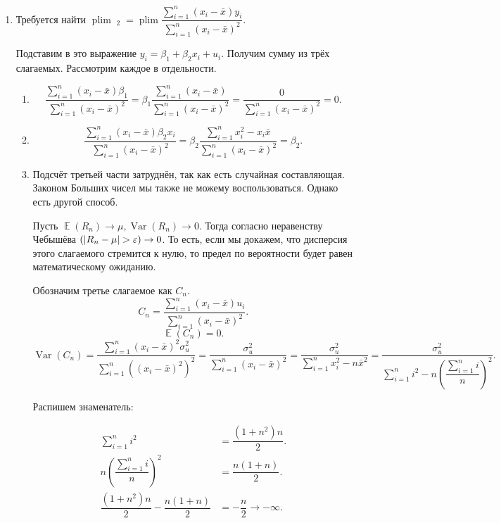 \documentclass[10pt, a4paper]{extarticle}
\let\P\relax
\DeclareMathOperator{\P}{\mathbb{P}}
\DeclareMathOperator{\E}{\mathbb{E}}
\DeclareMathOperator{\plim}{plim}
\DeclareMathOperator{\Var}{Var}
\DeclareMathOperator{\hb}{\hat{\beta}}
\begin{document}
\begin{enumerate}
	\item 
	
	Требуется найти $\plim \hb_2 = \plim \dfrac{\sum_{i = 1}^n(x_i - \bar{x})y_i}{\sum_{i = 1}^n(x_i - \bar{x})^2}$.
	
	Подставим в это выражение $y_i = \beta_1 + \beta_2x_i + u_i$. Получим сумму из трёх слагаемых. Рассмотрим каждое в отдельности.
	
	\begin{enumerate}
		\item 
		
		\[\dfrac{\sum_{i = 1}^n(x_i - \bar{x})\beta_1}{\sum_{i = 1}^n(x_i - \bar{x})^2} = \beta_1 \dfrac{\sum_{i = 1}^n(x_i - \bar{x})}{\sum_{i = 1}^n(x_i - \bar{x})^2} = \dfrac{0}{\sum_{i = 1}^n(x_i - \bar{x})^2} = 0.\]
		
		\item 
		
		\[\dfrac{\sum_{i = 1}^n(x_i - \bar{x})\beta_2x_i}{\sum_{i = 1}^n(x_i - \bar{x})^2} = \beta_2 \dfrac{\sum_{i = 1}^n x_i^2 - x_i\bar{x}}{\sum_{i = 1}^n(x_i - \bar{x})^2} = \beta_2.\]
		
		\item 
		
		Подсчёт третьей части затруднён, так как есть случайная составляющая. Законом Больших чисел мы также не можему воспользоваться. Однако есть другой способ. 
		
		Пусть $\E(R_n) \to \mu, \Var(R_n) \to 0$. Тогда согласно неравенству Чебышёва $\P(|R_n - \mu| > \varepsilon) \to 0$. То есть, если мы докажем, что дисперсия этого слагаемого стремится к нулю, то предел по вероятности будет равен математическому ожиданию.
		
		Обозначим третье слагаемое как $C_n$.
		\[C_n = \dfrac{\sum_{i = 1}^n(x_i - \bar{x})u_i}{\sum_{i = 1}^n(x_i - \bar{x})^2}.\]
		\[\E(C_n) = 0.\]
		\[\Var(C_n) =  \dfrac{\sum_{i = 1}^n(x_i - \bar{x})^2 \sigma_u^2}{\sum_{i = 1}^n((x_i - \bar{x})^2)^2} = \dfrac{\sigma_u^2}{\sum_{i = 1}^n(x_i - \bar{x})^2} = \dfrac{\sigma_u^2}{\sum_{i = 1}^n x_i^2 - n\bar{x}^2} = \dfrac{\sigma_u^2}{\sum_{i = 1}^n i^2 - n \left( \dfrac{\sum_{i = 1}^n i}{n} \right)^2}.\]
		
		Распишем знаменатель:
		
		\begin{align*}
			\sum_{i = 1}^n i^2 &= \dfrac{(1 + n^2)n}{2}. \\
			n \left( \dfrac{\sum_{i = 1}^n i}{n} \right)^2 &= \dfrac{n(1+n)}{2}. \\
			\dfrac{(1 + n^2)n}{2} - \dfrac{n(1+n)}{2} &= -\dfrac{n}{2} \rightarrow -\infty.
		\end{align*}
		

\end{enumerate}
\end{enumerate}
\end{document}
